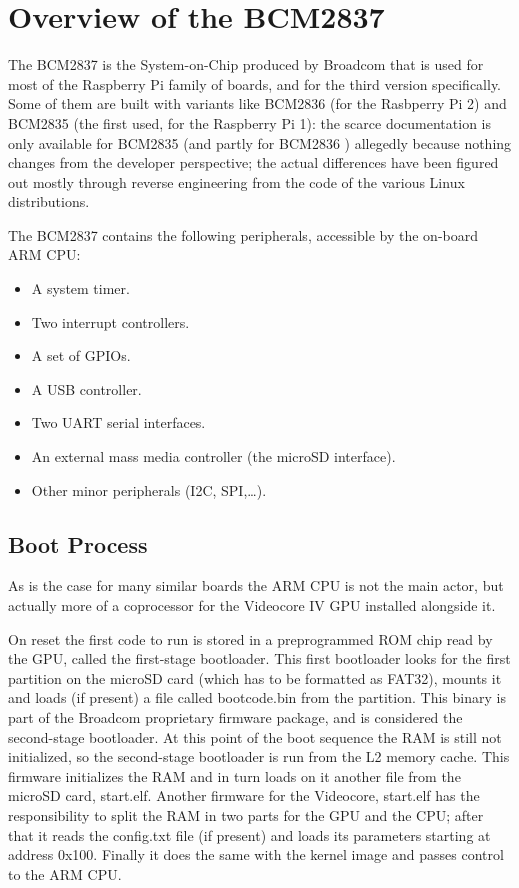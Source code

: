 \documentclass[12pt,a4paper,openright,twoside]{report}
\begin{document}


\clearpage{\pagestyle{empty}\cleardoublepage}
\chapter{Overview of the BCM2837}
The BCM2837 is the System-on-Chip produced by Broadcom that is used for most
of the Raspberry Pi family of boards, and for the third version specifically.
 Some of them are built with variants like BCM2836 (for the Rasbperry Pi 2)
  and BCM2835 (the first used, for the Raspberry Pi 1): the scarce documentation
  is only available for BCM2835 \cite{bcm2835} (and partly for BCM2836 \cite{rev3.4})
  allegedly because nothing changes from the developer perspective; the actual 
  differences have been figured out mostly through reverse engineering from the 
  code of the various Linux distributions.

The BCM2837 contains the following peripherals, accessible by the on-board ARM CPU:
\begin{itemize}
    \item A system timer.
    \item Two interrupt controllers.
    \item A set of GPIOs.
    \item A USB controller.
    \item Two UART serial interfaces.
    \item An external mass media controller (the microSD interface).
    \item Other minor peripherals (I2C, SPI,\ldots).
\end{itemize}

\section{Boot Process}
As is the case for many similar boards the ARM CPU is not the main
actor, but actually more of a coprocessor for the Videocore IV GPU installed
alongside it.

On reset the first code to run is stored in a preprogrammed ROM chip read by the GPU,
called the first-stage bootloader. This first bootloader looks for the first
partition on the microSD card (which has to be formatted as FAT32), mounts
it and loads (if present) a file called bootcode.bin from the partition.
This binary is part of the Broadcom proprietary firmware package, and is considered
the second-stage bootloader.
At this point of the boot sequence the RAM is still not initialized, so the second-stage
bootloader is run from the L2 memory cache. This firmware initializes the RAM 
and in turn loads on it another file from the microSD card, start.elf.
Another firmware for the Videocore, start.elf has the responsibility to split 
the RAM in two parts for the GPU and the CPU; after that it reads the config.txt 
file (if present) and loads its parameters starting at address 0x100.
 Finally it does the same with the kernel image and passes control to the ARM CPU.
\end{document}
